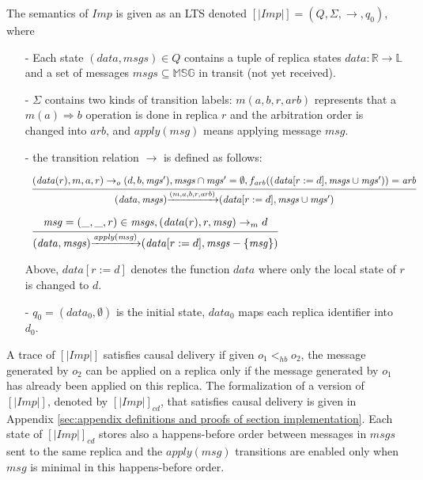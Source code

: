 The semantics of $\mathit{Imp}$ is given as an LTS denoted $[|\mathit{Imp}|] = (Q,\Sigma,\rightarrow,q_0)$, where

\begin{itemize}
\setlength{\itemsep}{0.5pt}
\item[-] Each state $(\mathit{data},\mathit{msgs}) \in Q$ contains a tuple of replica states $\mathit{data}: \mathbb{R} \rightarrow \mathbb{L}$ and a set of messages $\mathit{msgs} \subseteq \mathbb{MSG}$ in transit (not yet received).

\item[-] $\Sigma$ contains two kinds of transition labels: $m(a,b,r,\mathit{arb})$ represents that a $m(a) \Rightarrow b$ operation is done in replica $r$ and the arbitration order is changed into $\mathit{arb}$, and $\mathit{apply}(\mathit{msg})$ means applying message $\mathit{msg}$.

\item[-] the transition relation $\rightarrow$ is defined as follows:

\medskip
    $\begin{array}{l c} \bigfrac{ (\mathit{data}(r),m,a,r) \rightarrow_o (d,b,\mathit{mgs}'), \mathit{msgs} \cap \mathit{mgs}' = \emptyset, f_{\mathit{arb}}((\mathit{data}[r:= d], \mathit{msgs} \cup \mathit{mgs}')) = \mathit{arb}} {(\mathit{data},\mathit{msgs}) {\xrightarrow{(m,a,b,r,\mathit{arb})}} (\mathit{data}[r:=d], \mathit{msgs} \cup \mathit{mgs}')} \end{array}$

\medskip
    $\begin{array}{l c} \bigfrac{ \mathit{msg} = (\_,\_,r) \in \mathit{msgs},(\mathit{data}(r),r,\mathit{msg}) \rightarrow_m d } {(\mathit{data},\mathit{msgs}) {\xrightarrow{\mathit{apply}(\mathit{msg})}} (\mathit{data}[r:=d],\mathit{msgs} - \{ \mathit{msg} \})} \end{array}$

\medskip
Above, $\mathit{data}[r:=d]$ denotes the function $\mathit{data}$ where only the local state of $r$ is changed to $d$.
\item[-] $q_0 = (data_0,\emptyset)$ is the initial state, $data_0$ maps each replica identifier into $d_0$.
\end{itemize}

A trace of $[|\mathit{Imp}|]$ satisfies causal delivery if given $o_1 <_{\mathit{hb}} o_2$, the message generated by $o_2$ can be applied on a replica only if the message generated by $o_1$ has already been applied on this replica. The formalization of a version of $[|\mathit{Imp}|]$, denoted by $[|\mathit{Imp}|]_{cd}$, that satisfies causal delivery is given in Appendix \ref{sec:appendix definitions and proofs of section implementation}. Each state of $[|\mathit{Imp}|]_{cd}$ stores also a happens-before order between messages in $\mathit{msgs}$ sent to the same replica and the $\mathit{apply}(\mathit{msg})$ transitions are enabled only when $\mathit{msg}$ is minimal in this happens-before order.



